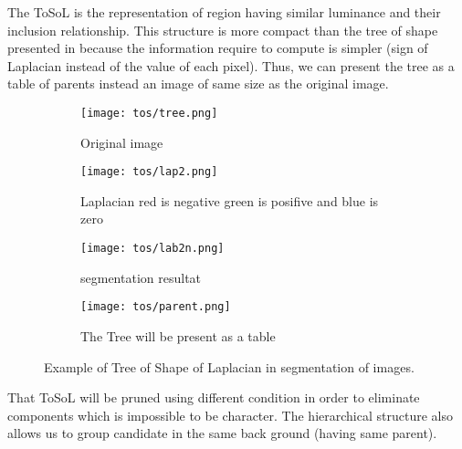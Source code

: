 \par
The ToSoL is the representation of region having similar luminance and their inclusion relationship. This structure is more compact than the tree of shape presented in \cite{geraud.13.ismm} because the information require to compute is simpler (sign of Laplacian instead of the value of each pixel). Thus, we can present the tree as a table of parents instead an image of same size as the original image. 

\begin{figure}
	\centering
	\begin{subfigure}[t]{2in}
		\centering
	 	\texttt{[image: tos/tree.png]} \caption{Original image}\label{fig:tosOri} \end{subfigure}   
	\begin{subfigure}[t]{2in}
		\centering
	 	\texttt{[image: tos/lap2.png]} \caption{Laplacian red is negative green is posifive and blue is zero}\label{fig:tosLap} \end{subfigure}   
	\begin{subfigure}[t]{2in}
		\centering
		\texttt{[image: tos/lab2n.png]} \caption{segmentation resultat}\label{fig:tosLab} \end{subfigure}
	\centering
		
	\begin{subfigure}[t]{2in}
		\centering
		\texttt{[image: tos/parent.png]} 
		\caption{The Tree will be present as a table}\label{fig:tosParent} \end{subfigure}					
	\centering
	\caption[Example of \textit{Tree of Shape of Laplacian}] {Example of Tree of Shape of Laplacian in segmentation of images.  }
	\label{fig:ToS}
\end{figure}

\par That ToSoL will be pruned using different condition in order to eliminate components which is impossible to be character. The hierarchical structure also allows us to group candidate in the same back ground (having same parent).

